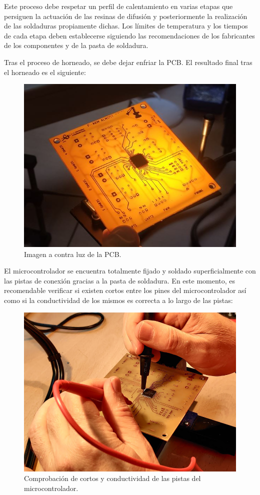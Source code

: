 \begin{enumerate}
   Este proceso debe respetar un perfil de calentamiento en varias etapas que persiguen la actuación de las resinas de difusión y posteriormente la realización de las soldaduras propiamente dichas. Los límites de temperatura y los tiempos de cada etapa deben establecerse siguiendo las recomendaciones de los fabricantes de los componentes y de la pasta de soldadura.
     
     Tras el proceso de horneado, se debe dejar enfriar la \ac{PCB}. El resultado final tras el horneado es el siguiente:
     
    \begin{figure}[H]
    \centering 
    \includegraphics[width=0.55\linewidth]{pictures/POTENSIA.jpg}
    \caption{Imagen a contra luz de la \ac{PCB}.}
    \end{figure}
    
    El microcontrolador se encuentra totalmente fijado y soldado superficialmente con las pistas de conexión gracias a la pasta de soldadura. En este momento, es recomendable verificar si existen cortos entre los pines del microcontrolador así como si la conductividad de los mismos es correcta a lo largo de las pistas:
    
    \begin{figure}[H]
    \centering 
    \includegraphics[width=0.55\linewidth]{pictures/CORTOS.jpg}
    \caption{Comprobación de cortos y conductividad de las pistas del microcontrolador.}
    \end{figure}
    

\end{enumerate}
